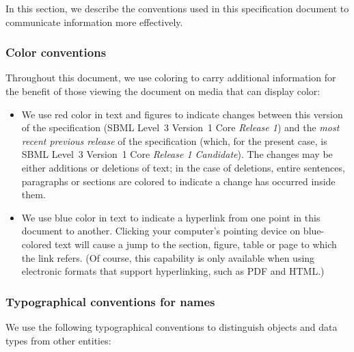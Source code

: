 In this section, we describe the conventions used in this
specification document to communicate information more
effectively.

\begin{blockChanged}

\subsubsection{Color conventions}
\label{sec:notation-color}

Throughout this document, we use coloring to carry additional
information for the benefit of those viewing the document on media
that can display color:

\begin{itemize}

\item We use red color in text and figures to indicate changes
  between this version of the specification (SBML Level~3
  Version~1 Core \emph{Release 1}) and the \emph{most recent
    previous release} of the specification (which, for the present
  case, is SBML Level~3 Version~1 Core \emph{Release 1
    Candidate}).  The changes may be either additions or deletions
  of text; in the case of deletions, entire sentences, paragraphs
  or sections are colored to indicate a change has occurred inside
  them.

\item We use blue color in text to indicate a hyperlink from one
  point in this document to another.  Clicking your computer's
  pointing device on blue-colored text will cause a jump to the
  section, figure, table or page to which the link refers.  (Of
  course, this capability is only available when using electronic
  formats that support hyperlinking, such as PDF and
  HTML.)

\end{itemize}

\end{blockChanged}


\subsubsection{Typographical conventions for names}
\label{sec:notation-typographical}

We use the following typographical conventions to distinguish
objects and data types from other entities:

